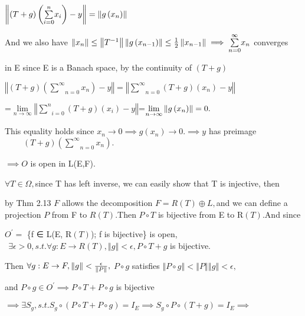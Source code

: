 \documentclass{article}
\begin{document}
\bigskip $\left\Vert \left( T+g\right) \left( \underset{i=0}{\overset{n}{%
\sum }}x_{i}\right) -y\right\Vert =\left\Vert g\left( x_{n}\right)
\right\Vert $

And we also have $\left\Vert x_{n}\right\Vert \leq \left\Vert
T^{-1}\right\Vert \left\Vert g\left( x_{n-1}\right) \right\Vert \leq \frac{1%
}{2}\left\Vert x_{n-1}\right\Vert \implies \underset{n=0}{\overset{\infty }{%
\sum }}x_{n}$ converges 

in E since E is a Banach space, by the continuity of $\left( T+g\right) $

$\left\Vert \left( T+g\right) \left( \underset{n=0}{\overset{\infty }{\sum }}%
x_{n}\right) -y\right\Vert =\left\Vert \underset{n=0}{\overset{\infty }{\sum 
}}\left( T+g\right) \left( x_{n}\right) -y\right\Vert $

=$\underset{n\rightarrow \infty }{\lim }\left\Vert \underset{i=0}{\overset{n}%
{\sum }}\left( T+g\right) \left( x_{i}\right) -y\right\Vert $=$\underset{%
n\rightarrow \infty }{\lim }\left\Vert g\left( x_{n}\right) \right\Vert =0.$

This equality holds since $x_{n}\rightarrow 0\implies g\left( x_{n}\right)
\rightarrow 0.\implies y$ has preimage $\ \qquad \left( T+g\right) \left( 
\underset{n=0}{\overset{\infty }{\sum }}x_{n}\right) .$ 

$\implies O$ is open in L(E,F). 

$\forall T\in \Omega ,$since T has left inverse, we can easily show that T
is injective, then 

by Thm 2.13 $F$ allows the decomposition $F=R\left( T\right) \oplus L,$and
we can define a projection $P$ from F to $R\left( T\right) .$Then $P\circ T$
is bijective from E to R$\left( T\right) .$And since

$O^{\prime }=$ \{f ∈ L(E, R$\left( T\right) $); f is bijective\} is
open, $\ \ \exists \epsilon >0,s.t.\forall g:E\rightarrow R\left( T\right)
,\left\Vert g\right\Vert <\epsilon ,P\circ T+g$ is bijective.

Then $\forall g:E\rightarrow F,\left\Vert g\right\Vert <\frac{\epsilon }{%
\left\Vert P\right\Vert },$ $P\circ g$ satisfies $\left\Vert P\circ
g\right\Vert <\left\Vert P\right\Vert \left\Vert g\right\Vert <\epsilon ,$

and $P\circ g\in O^{\prime }\implies P\circ T+P\circ g$ is bijective

$\implies \exists S_{g},s.t.S_{g}\circ \left( P\circ T+P\circ g\right)
=I_{E}\implies S_{g}\circ P\circ \left( T+g\right) =I_{E}\implies $
\end{document}
